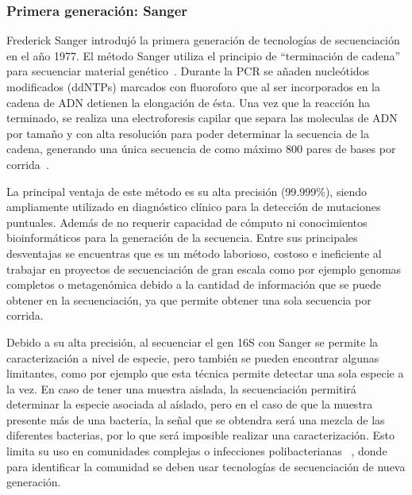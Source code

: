 \subsubsection{Primera generación: Sanger}
Frederick Sanger introdujó la primera generación de tecnologías de secuenciación en el año 1977. El método Sanger utiliza el principio de ``terminación de cadena'' para secuenciar material genético~\cite{sanger1975rapid}. 
Durante la PCR se añaden nucleótidos modificados (ddNTPs) marcados con fluoroforo que al ser incorporados en la cadena de ADN detienen la elongación de ésta. Una vez que la reacción ha terminado, se realiza una electroforesis capilar que separa las moleculas de ADN por tamaño y con alta resolución para poder determinar la secuencia de la cadena, generando una única secuencia de como máximo 800 pares de bases por corrida~\cite{crossley2020guidelines}.

La principal ventaja de este método es su alta precisión (99.999\%), siendo ampliamente utilizado en diagnóstico clínico para la detección de mutaciones puntuales. Además de no requerir capacidad de cómputo ni conocimientos bioinformáticos para la generación de la secuencia.  
Entre sus principales desventajas se encuentras que es un método laborioso, costoso e ineficiente al trabajar en proyectos de secuenciación de gran escala como por ejemplo genomas completos o metagenómica debido a la cantidad de información que se puede obtener en la secuenciación, ya que permite obtener una sola secuencia por corrida.
 
Debido a su alta precisión, al secuenciar el gen 16S con Sanger se permite la caracterización a nivel de especie, pero también se pueden encontrar algunas limitantes, como por ejemplo que esta técnica permite detectar una sola especie a la vez. En caso de tener una muestra aislada, la secuenciación permitirá determinar la especie asociada al aíslado, pero en el caso de que la muestra presente más de una bacteria, la señal que se obtendra será una mezcla de las diferentes bacterias, por lo que será imposible realizar una caracterización. 
Esto limita su uso en comunidades complejas o infecciones polibacterianas ~\cite{lamoureux2022prospective}, donde para identificar la comunidad se deben usar tecnologías de secuenciación de nueva generación.
